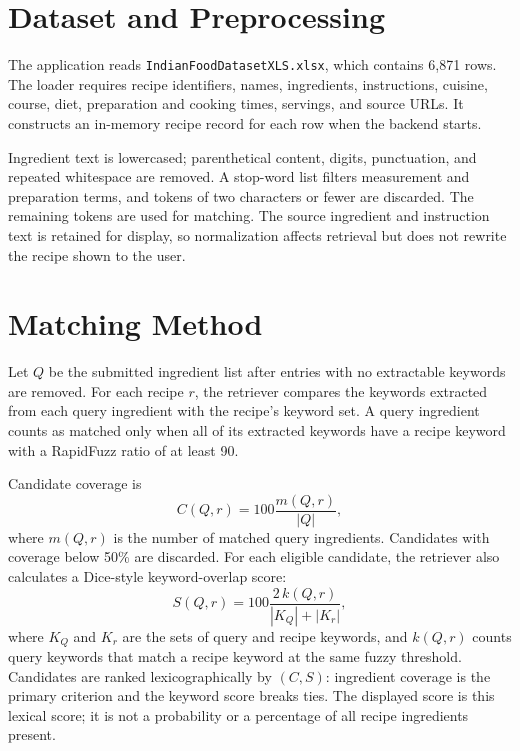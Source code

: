 \documentclass[conference]{IEEEtran}
\begin{document}
\section{Dataset and Preprocessing}
The application reads \texttt{IndianFoodDatasetXLS.xlsx}, which contains 6,871 rows. The loader requires recipe identifiers, names, ingredients, instructions, cuisine, course, diet, preparation and cooking times, servings, and source URLs. It constructs an in-memory recipe record for each row when the backend starts.

Ingredient text is lowercased; parenthetical content, digits, punctuation, and repeated whitespace are removed. A stop-word list filters measurement and preparation terms, and tokens of two characters or fewer are discarded. The remaining tokens are used for matching. The source ingredient and instruction text is retained for display, so normalization affects retrieval but does not rewrite the recipe shown to the user.

\section{Matching Method}
Let \(Q\) be the submitted ingredient list after entries with no extractable keywords are removed. For each recipe \(r\), the retriever compares the keywords extracted from each query ingredient with the recipe's keyword set. A query ingredient counts as matched only when all of its extracted keywords have a recipe keyword with a RapidFuzz ratio of at least 90.

Candidate coverage is
\begin{equation}
C(Q,r)=100\frac{m(Q,r)}{|Q|},
\label{eq:coverage}
\end{equation}
where \(m(Q,r)\) is the number of matched query ingredients. Candidates with coverage below 50\% are discarded. For each eligible candidate, the retriever also calculates a Dice-style keyword-overlap score:
\begin{equation}
S(Q,r)=100\frac{2\,k(Q,r)}{|K_Q|+|K_r|},
\label{eq:score}
\end{equation}
where \(K_Q\) and \(K_r\) are the sets of query and recipe keywords, and \(k(Q,r)\) counts query keywords that match a recipe keyword at the same fuzzy threshold. Candidates are ranked lexicographically by \((C,S)\): ingredient coverage is the primary criterion and the keyword score breaks ties. The displayed score is this lexical score; it is not a probability or a percentage of all recipe ingredients present.
\end{document}
